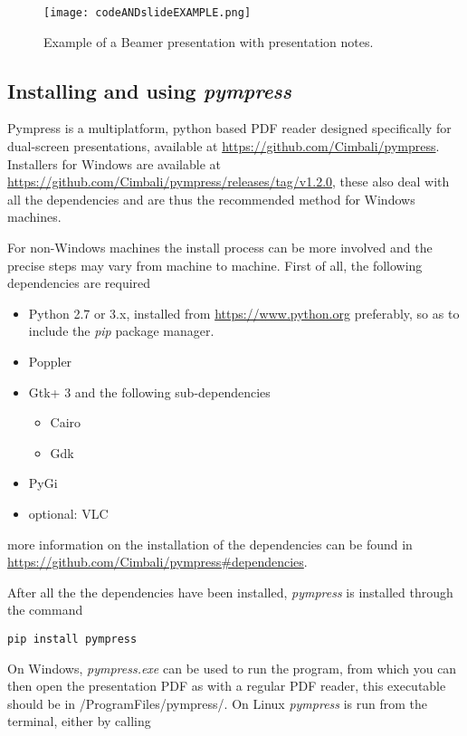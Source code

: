 \begin{figure}[h]
\centering
\texttt{[image: codeANDslideEXAMPLE.png]}
\caption{Example of a Beamer presentation with presentation notes.}
\label{fig:slidesAndNotesExample}
\end{figure}

\subsection{Installing and using \textit{pympress}}

Pympress is a multiplatform, python based PDF reader designed specifically for dual-screen presentations, available at \url{https://github.com/Cimbali/pympress}. Installers for Windows are available at \url{https://github.com/Cimbali/pympress/releases/tag/v1.2.0}, these also deal with all the dependencies and are thus the recommended method for Windows machines.
\par
For non-Windows machines the install process can be more involved and the precise steps may vary from machine to machine. First of all, the following dependencies are required
\begin{itemize}
\item Python 2.7 or 3.x, installed from \url{https://www.python.org} preferably, so as to include the \textit{pip} package manager.
\item Poppler
\item Gtk+ 3 and the following sub-dependencies
\begin{itemize}
\item Cairo
\item Gdk
\end{itemize}
\item PyGi
\item optional: VLC
\end{itemize}
more information on the installation of the dependencies can be found in \url{https://github.com/Cimbali/pympress#dependencies}.
\par
After all the the dependencies have been installed, \textit{pympress} is installed through the command
\begin{verbatim}
pip install pympress
\end{verbatim}
\par
On Windows, \textit{pympress.exe} can be used to run the program, from which you can then open the presentation PDF as with a regular PDF reader, this executable should be in /ProgramFiles/pympress/. On Linux \textit{pympress} is run from the terminal, either by calling
